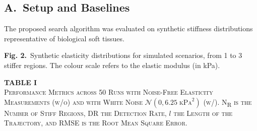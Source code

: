 \documentclass[11pt]{article}
\begin{document}
\subsection*{A.\ Setup and Baselines}

The proposed search algorithm was evaluated on synthetic stiffness
distributions representative of biological soft tissues.

\newpage

\setcounter{equation}{5}

\begin{center}
\end{center}

\vspace{0.4em}

\textbf{Fig. 2.}\ Synthetic elasticity distributions for simulated
scenarios, from 1 to 3 stiffer regions. The colour scale refers to
the elastic modulus (in kPa).

\vspace{0.8em}

\begin{center}
\textbf{TABLE I}\\[2pt]
\textsc{Performance Metrics across 50 Runs with Noise-Free Elasticity
Measurements (w/o) and with White Noise $\mathcal{N}(0, 6.25\;
\mathrm{kPa}^{2})$ (w/). N\textsubscript{R} is the Number of Stiff
Regions, DR the Detection Rate, $l$ the Length of the Trajectory, and
RMSE is the Root Mean Square Error.}
\end{center}
\end{document}
